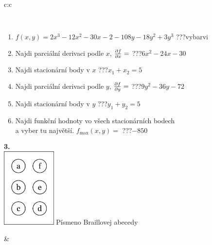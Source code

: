 \documentclass[10pt]{report}
\begin{document}
\begin{tabular}{c:c}
\begin{minipage}[c][104.5mm][t]{0.5\linewidth}
\begin{center}
\begin{minipage}{0.95\linewidth}
\begin{center}
\end{center}
\end{minipage}
\\[1mm]
\begin{minipage}{0.79\linewidth}
\begin{center}
\begin{varwidth}{\linewidth}
\begin{enumerate}
\normalsize
\item $f(x,y)=2x^3-12x^2-30x-2-108y-18y^2+3y^3$\quad \dotfill\; ???\;\dotfill \quad vybarvi
\item Najdi parciální derivaci podle $x$, $\pdv{f}{x}=$\quad \dotfill\; ???\;\dotfill \quad $6x^2-24x-30$
\item Najdi stacionární body v $x$\quad \dotfill\; ???\;\dotfill \quad $x_1+x_2=5$
\item Najdi parciální derivaci podle $y$, $\pdv{f}{y}=$\quad \dotfill\; ???\;\dotfill \quad $9y^2-36y-72$
\item Najdi stacionární body v $y$\quad \dotfill\; ???\;\dotfill \quad $y_1+y_2=5$
\item Najdi funkční hodnoty vo všech stacionárních bodech \\ \phantom{xxxxxx} a vyber tu najvětší. $f_{\text{max}}(x,y)=$\quad \dotfill\; ???\;\dotfill \quad $-850$
\end{enumerate}
\end{varwidth}
\end{center}
\end{minipage}
\begin{minipage}{0.20\linewidth}
\begin{center}
{\Huge\bfseries 3.} \\[2mm]
\includegraphics[height=40mm]{../images/braille.png}
{\small Písmeno Braillovej abecedy}
\end{center}
\end{minipage}
\end{center}
\end{minipage}
&
\begin{minipage}[c][104.5mm][t]{0.5\linewidth}
\begin{center}

\end{center}
\end{minipage}
\end{tabular}
\end{document}
